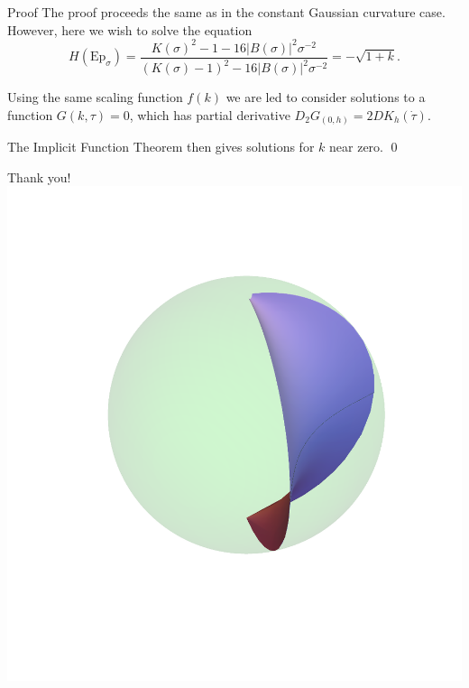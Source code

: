 \documentclass[professionalfont]{beamer}
\begin{document}


\begin{frame}{Proof}
The proof proceeds the same as in the constant Gaussian curvature case. However, here we wish to solve the equation 
\[
H(\mathrm{Ep}_\sigma)
= \frac{K(\sigma)^2 - 1 - 16|B(\sigma)|^2\sigma^{-2}}{(K(\sigma) - 1)^2 - 16|B(\sigma)|^2\sigma^{-2}} = -\sqrt{1 + k}.
\]\pause

Using the same scaling function $f(k)$ we are led to consider solutions to a function $G(k,\tau) = 0$, which has partial derivative $D_2G_{(0,h)} = 2D K_h(\dot{\tau})$. 
\newline \pause


The Implicit Function Theorem then gives solutions for $k$ near zero. \qed

\end{frame}








\begin{frame}
\begin{center}
\vspace{1cm}
Thank you! \\
\includegraphics[scale=0.25]{k-surface.png}
\end{center}
\end{frame}
\end{document}
